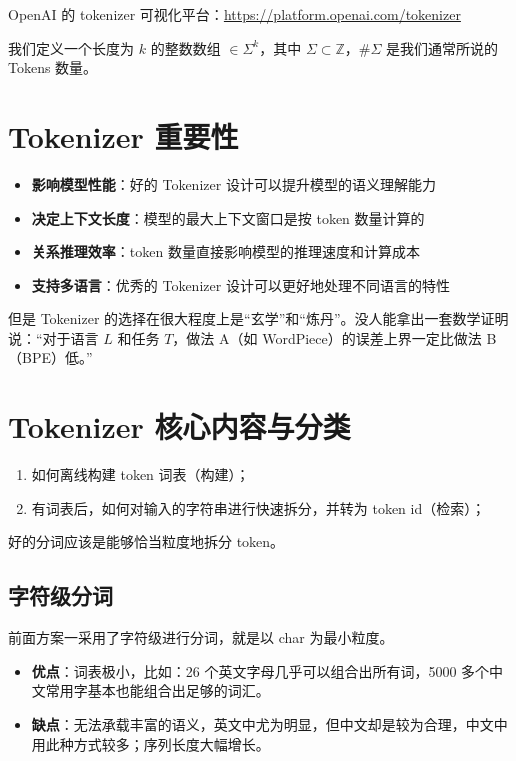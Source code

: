 \documentclass[11pt, a4paper]{article}
\begin{document}
OpenAI 的 tokenizer 可视化平台：\url{https://platform.openai.com/tokenizer}

我们定义一个长度为 $k$ 的整数数组 $\in \Sigma^{k}$，其中 $\Sigma\subset \mathbb{Z}$，$\# \Sigma$ 是我们通常所说的 Tokens 数量。

\section{Tokenizer 重要性}

\begin{itemize}
    \item \textbf{影响模型性能}：好的 Tokenizer 设计可以提升模型的语义理解能力
    \item \textbf{决定上下文长度}：模型的最大上下文窗口是按 token 数量计算的
    \item \textbf{关系推理效率}：token 数量直接影响模型的推理速度和计算成本
    \item \textbf{支持多语言}：优秀的 Tokenizer 设计可以更好地处理不同语言的特性
\end{itemize}

但是 Tokenizer 的选择在很大程度上是“玄学”和“炼丹”。没人能拿出一套数学证明说：“对于语言 $L$ 和任务 $T$，做法 A（如 WordPiece）的误差上界一定比做法 B（BPE）低。”

\section{Tokenizer 核心内容与分类}

\begin{enumerate}
    \item 如何离线构建 token 词表（构建）；
    \item 有词表后，如何对输入的字符串进行快速拆分，并转为 token id（检索）；
\end{enumerate}

好的分词应该是能够恰当粒度地拆分 token。

\subsection*{字符级分词}
前面方案一采用了字符级进行分词，就是以 char 为最小粒度。
\begin{itemize}
    \item \textbf{优点}：词表极小，比如：26 个英文字母几乎可以组合出所有词，5000 多个中文常用字基本也能组合出足够的词汇。
    \item \textbf{缺点}：无法承载丰富的语义，英文中尤为明显，但中文却是较为合理，中文中用此种方式较多；序列长度大幅增长。
\end{itemize}
\end{document}
